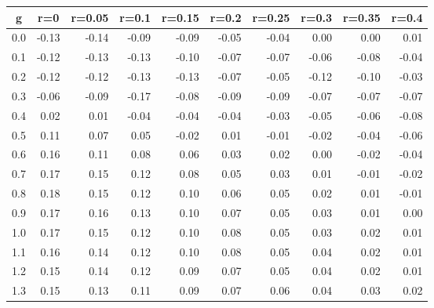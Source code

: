 %
\begin{table}[!tbp]
 \begin{center}
 \begin{tabular}{rrrrrrrrrr}\hline\hline
\multicolumn{1}{c}{g}&\multicolumn{1}{c}{r=0}&\multicolumn{1}{c}{r=0.05}&\multicolumn{1}{c}{r=0.1}&\multicolumn{1}{c}{r=0.15}&\multicolumn{1}{c}{r=0.2}&\multicolumn{1}{c}{r=0.25}&\multicolumn{1}{c}{r=0.3}&\multicolumn{1}{c}{r=0.35}&\multicolumn{1}{c}{r=0.4}\tabularnewline
\hline
0.0&-0.13&-0.14&-0.09&-0.09&-0.05&-0.04& 0.00& 0.00& 0.01\tabularnewline
0.1&-0.12&-0.13&-0.13&-0.10&-0.07&-0.07&-0.06&-0.08&-0.04\tabularnewline
0.2&-0.12&-0.12&-0.13&-0.13&-0.07&-0.05&-0.12&-0.10&-0.03\tabularnewline
0.3&-0.06&-0.09&-0.17&-0.08&-0.09&-0.09&-0.07&-0.07&-0.07\tabularnewline
0.4& 0.02& 0.01&-0.04&-0.04&-0.04&-0.03&-0.05&-0.06&-0.08\tabularnewline
0.5& 0.11& 0.07& 0.05&-0.02& 0.01&-0.01&-0.02&-0.04&-0.06\tabularnewline
0.6& 0.16& 0.11& 0.08& 0.06& 0.03& 0.02& 0.00&-0.02&-0.04\tabularnewline
0.7& 0.17& 0.15& 0.12& 0.08& 0.05& 0.03& 0.01&-0.01&-0.02\tabularnewline
0.8& 0.18& 0.15& 0.12& 0.10& 0.06& 0.05& 0.02& 0.01&-0.01\tabularnewline
0.9& 0.17& 0.16& 0.13& 0.10& 0.07& 0.05& 0.03& 0.01& 0.00\tabularnewline
1.0& 0.17& 0.15& 0.12& 0.10& 0.08& 0.05& 0.03& 0.02& 0.01\tabularnewline
1.1& 0.16& 0.14& 0.12& 0.10& 0.08& 0.05& 0.04& 0.02& 0.01\tabularnewline
1.2& 0.15& 0.14& 0.12& 0.09& 0.07& 0.05& 0.04& 0.02& 0.01\tabularnewline
1.3& 0.15& 0.13& 0.11& 0.09& 0.07& 0.06& 0.04& 0.03& 0.02\tabularnewline
\hline
\end{tabular}

\end{center}

\end{table}

